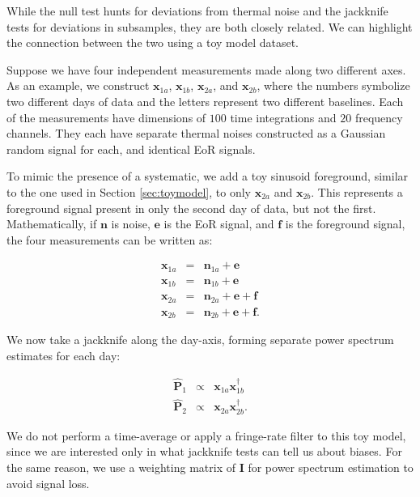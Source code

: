 \documentclass[preprint2,numberedappendix,tighten]{aastex6}
\begin{document}
While the null test hunts for deviations from thermal noise and the jackknife tests for deviations in subsamples, they are both 
closely related. We can highlight the connection between the two using a toy model dataset.

Suppose we have four independent measurements made along two different axes. As an example, we construct $\textbf{x}_{1a}$, $\textbf{x}_{1b}$, $\textbf{x}_{2a}$, and $\textbf{x}_{2b}$, where the numbers symbolize two different days of data and the letters represent two different baselines. Each of the 
measurements have dimensions of $100$ time integrations and $20$ frequency channels. They each have separate thermal 
noises constructed as a Gaussian random signal for each, and identical EoR signals. 

To mimic the presence of a systematic, we add a toy sinusoid foreground, similar to the one used in 
Section \ref{sec:toymodel}, to only $\textbf{x}_{2a}$ and $\textbf{x}_{2b}$. This represents a foreground signal 
present in only the second day of data, but not the first. Mathematically, if  $\textbf{n}$ 
is noise, $\textbf{e}$ is the EoR signal, and $\textbf{f}$ is the foreground signal, the four measurements can be written as:

\begin{eqnarray}
\label{eq:bias1}
\textbf{x}_{1a} &=& \textbf{n}_{1a} + \textbf{e}  \\ 
\textbf{x}_{1b} &=& \textbf{n}_{1b} + \textbf{e}  \\ 
\textbf{x}_{2a} &=& \textbf{n}_{2a} + \textbf{e} + \textbf{f} \\ 
\textbf{x}_{2b} &=& \textbf{n}_{2b} + \textbf{e} + \textbf{f}.
\end{eqnarray} 

\noindent We now take a jackknife along the day-axis, forming separate power spectrum estimates for each day:

\begin{eqnarray}
\widehat{\textbf{P}}_{1} &\propto& \textbf{x}_{1a}\textbf{x}_{1b}^{\dagger} \\
\widehat{\textbf{P}}_{2} &\propto& \textbf{x}_{2a}\textbf{x}_{2b}^{\dagger}.
\end{eqnarray}

We do not perform a time-average or apply a fringe-rate filter to this toy model, since we are interested only in what jackknife 
tests can tell us about biases. For the same reason, we use a weighting matrix of $\textbf{I}$ for power spectrum estimation to 
avoid signal loss. 
\end{document}
